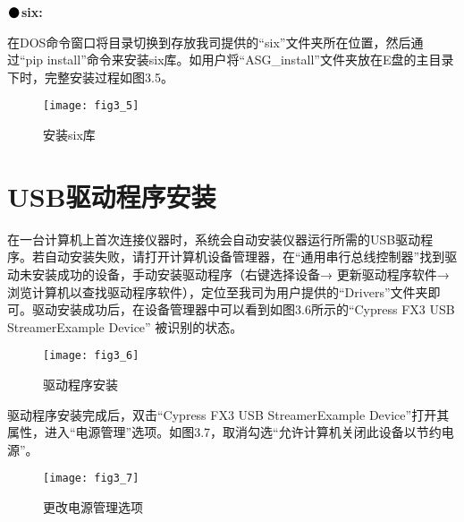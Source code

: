 \newpage
\noindent$\vcenter{\hbox{\huge$\bullet$}}$\quad\fontsize{12pt}{\baselineskip}\textbf{six:}

在DOS命令窗口将目录切换到存放我司提供的“six”文件夹所在位置，然后通过“pip install”命令来安装six库。如用户将“ASG\_install”文件夹放在E盘的主目录下时，完整安装过程如图3.5。
\begin{figure}[H]
\centering
\texttt{[image: fig3\_5]}
\caption{安装six库}
\end{figure}

\section{USB\heiti 驱动程序安装}
在一台计算机上首次连接仪器时，系统会自动安装仪器运行所需的USB驱动程序。若自动安装失败，请打开计算机设备管理器，在“通用串行总线控制器”找到驱动未安装成功的设备，手动安装驱动程序（右键选择设备→ 更新驱动程序软件→浏览计算机以查找驱动程序软件），定位至我司为用户提供的“Drivers”文件夹即可。驱动安装成功后，在设备管理器中可以看到如图3.6所示的“Cypress FX3 USB StreamerExample Device” 被识别的状态。
\begin{figure}[htbp]
\centering
\texttt{[image: fig3\_6]}
\caption{驱动程序安装}
\end{figure}

驱动程序安装完成后，双击“Cypress FX3 USB StreamerExample Device”打开其属性，进入“电源管理”选项。如图3.7，取消勾选“允许计算机关闭此设备以节约电源”。
\begin{figure}[htbp]
\centering
\texttt{[image: fig3\_7]}
\caption{更改电源管理选项}
\end{figure}




